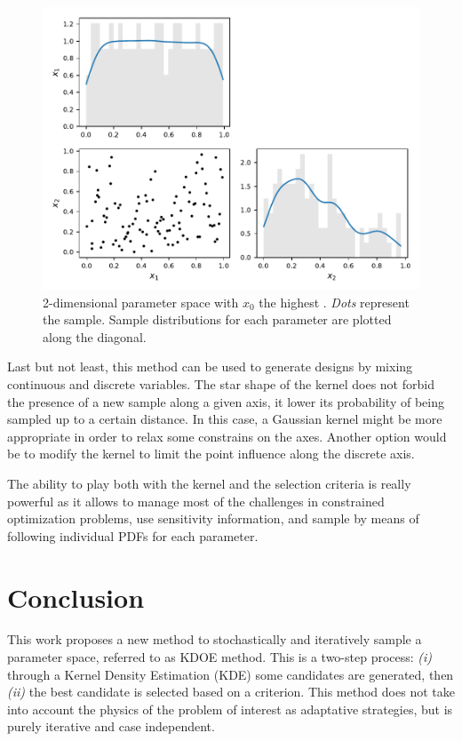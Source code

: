 \begin{figure}[!h]
\centering
\includegraphics[width=0.9\linewidth,keepaspectratio]{fig/contributions/doe/kde_sensitivity.pdf}
\caption{2-dimensional parameter space with $x_0$ the highest . \emph{Dots} represent the sample. Sample distributions for each parameter are plotted along the diagonal.}
\label{fig:sensitivity}
\end{figure}

Last but not least, this method can be used to generate designs by mixing continuous and discrete variables. The star shape of the kernel does not forbid the presence of a new sample along a given axis, it lower its probability of being sampled up to a certain distance. In this case, a Gaussian kernel might be more appropriate in order to relax some constrains on the axes. Another option would be to modify the kernel to limit the point influence along the discrete axis.

The ability to play both with the kernel and the selection criteria is really powerful as it allows to manage most of the challenges in constrained optimization problems, use sensitivity information, and sample by means of following individual PDFs for each parameter.

\section{Conclusion}
This work proposes a new method to stochastically and iteratively sample a parameter space, referred to as KDOE method. This is a two-step process: \emph{(i)} through a Kernel Density Estimation (KDE) some candidates are generated, then \emph{(ii)} the best candidate is selected based on a criterion. This method does not take into account the physics of the problem of interest as adaptative strategies, but is purely iterative and case independent.

